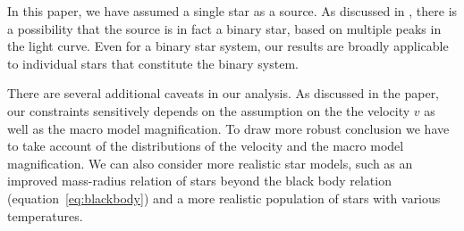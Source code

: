 \documentclass[showpacs,twocolumn,preprintnumbers,amsmath,amssymb,superscriptaddress,nofootinbib]{revtex4}
\newcommand{\morv}[1]{#1}
\begin{document}
In this paper, we have assumed a single star as a source. As discussed
in \cite{Kelly:2017fps}, there is a possibility that the source is in
fact a binary star, based on multiple peaks in the light curve. Even
for a binary star system, our results are broadly applicable to
individual stars that constitute the binary system.

There are several additional caveats in our analysis.
\morv{As discussed in the paper, our constraints sensitively depends
  on the assumption on the the velocity $v$ as well as the macro model
  magnification.  To draw more robust conclusion we have to take
  account of the distributions of the velocity and the macro model
  magnification.} We can also consider more realistic star models, such
  as  an improved mass-radius relation of stars beyond the black body
relation (equation~\ref{eq:blackbody}) and a more realistic population
of stars with various temperatures. 
\end{document}
